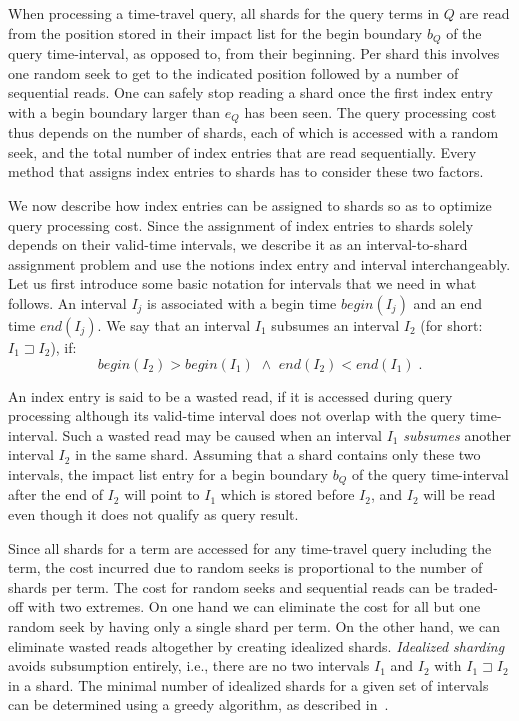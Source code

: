 When processing a time-travel query, all shards for the query terms in
$Q$ are read from the position stored in their impact list for the
begin boundary $b_{Q}$ of the query time-interval, as opposed to, from
their beginning. Per shard this involves one random seek to get to the
indicated position followed by a number of sequential reads. One can
safely stop reading a shard once the first index entry with a begin
boundary larger than $e_{Q}$ has been seen. The query processing cost
thus depends on the number of shards, each of which is accessed with a
random seek, and the total number of index entries that are read
sequentially. Every method that assigns index entries to shards has to
consider these two factors.

We now describe how index entries can be assigned to shards so as to
optimize query processing cost. Since the assignment of index entries
to shards solely depends on their valid-time intervals, we describe it
as an interval-to-shard assignment problem and use the notions index
entry and interval interchangeably. Let us first introduce some basic
notation for intervals that we need in what follows. An interval $I_j$
is associated with a begin time $begin(I_j)$ and an end time
$end(I_j)$. We say that an interval $I_1$ subsumes an interval $I_2$
(for short: $I_1 \sqsupset I_2$), if:
$$
begin(I_2) > begin(I_1) \,\,\wedge\,\, end(I_2) < end(I_1)\;.
$$

An index entry is said to be a wasted read, if it is accessed during
query processing although its valid-time interval does not overlap
with the query time-interval. Such a wasted read may be caused when an
interval $I_1$ \emph{subsumes} another interval $I_2$ in the same
shard. Assuming that a shard contains only these two intervals, the
impact list entry for a begin boundary $b_{Q}$ of the query
time-interval after the end of $I_2$ will point to $I_1$ which is
stored before $I_2$, and $I_2$ will be read even though it does not
qualify as query result.

Since all shards for a term are accessed for any time-travel query
including the term, the cost incurred due to random seeks is
proportional to the number of shards per term. The cost for random
seeks and sequential reads can be traded-off with two extremes. On one
hand we can eliminate the cost for all but one random seek by having
only a single shard per term. On the other hand, we can eliminate
wasted reads altogether by creating idealized shards. \emph{Idealized
  sharding} avoids subsumption entirely, i.e., there are no two
intervals $I_1$ and $I_2$ with $I_1 \sqsupset I_2$ in a shard. The
minimal number of idealized shards for a given set of intervals can be
determined using a greedy algorithm, as described
in~\cite{aanand:sigir2011}.

